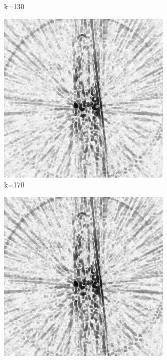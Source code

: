 \documentclass[journal]{IEEEtran}
\begin{document}
\begin{figure}[h]
\begin{subfigure}[b]{0.24\linewidth}
        \caption{k=130}
     \end{subfigure}
  \begin{subfigure}[b]{0.24\linewidth}
        \includegraphics[width=\textwidth]{../images/okra/2D_okra/weightsIm_170normalized.png}
        \caption{k=170}
     \end{subfigure}
  \begin{subfigure}[b]{0.24\linewidth}
        \includegraphics[width=\textwidth]{../images/okra/2D_okra/weightsIm_210normalized.png}

\end{subfigure}
\end{figure}
\end{document}
